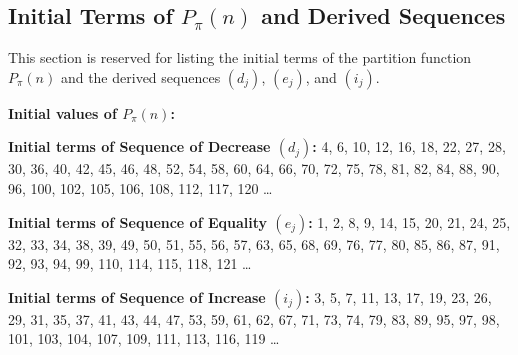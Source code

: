 \documentclass[]{article}
\theoremstyle{plain}%
\theoremstyle{definition}
\theoremstyle{remark}
\begin{document}
\subsection{Initial Terms of $P_{\pi}(n)$ and Derived Sequences}
\label{subsec:initial_terms}
This section is reserved for listing the initial terms of the partition function $P_{\pi}(n)$ and the derived sequences $(d_j)$, $(e_j)$, and $(i_j)$.

\vspace{5mm}
\noindent \textbf{Initial values of $P_{\pi}(n)$:}


\noindent \textbf{Initial terms of Sequence of Decrease $(d_j)$:}
4, 6, 10, 12, 16, 18, 22, 27, 28, 30, 36, 40, 42, 45, 46, 48, 52, 54, 58, 60, 64, 66, 70, 72, 75, 78, 81, 82, 84, 88, 90, 96, 100, 102, 105, 106, 108, 112, 117, 120 \dots

\noindent \textbf{Initial terms of Sequence of Equality $(e_j)$:}
1, 2, 8, 9, 14, 15, 20, 21, 24, 25, 32, 33, 34, 38, 39, 49, 50, 51, 55, 56, 57, 63, 65, 68, 69, 76, 77, 80, 85, 86, 87, 91, 92, 93, 94, 99, 110, 114, 115, 118, 121 \dots

\noindent \textbf{Initial terms of Sequence of Increase $(i_j)$:}
3, 5, 7, 11, 13, 17, 19, 23, 26, 29, 31, 35, 37, 41, 43, 44, 47, 53, 59, 61, 62, 67, 71, 73, 74, 79, 83, 89, 95, 97, 98, 101, 103, 104, 107, 109, 111, 113, 116, 119 \dots
\end{document}
